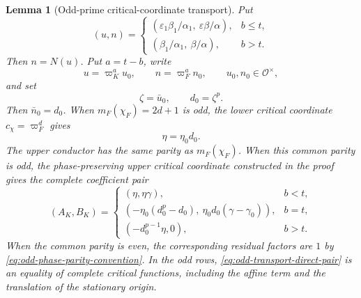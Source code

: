 \documentclass[11pt]{amsart}
\newtheorem{lemma}[theorem]{Lemma}
\theoremstyle{definition}
\theoremstyle{remark}
\newcommand{\cO}{\mathcal O}
\newcommand{\eps}{\varepsilon}
\begin{document}
\begin{lemma}[Odd-prime critical-coordinate transport]
\label{lem:residual-parameter-transport}
Put
\[
 (u,n)=
 \begin{cases}
 \left(\eps_1\beta_1/\alpha_1,\ \eps\beta/\alpha\right),&b\le t,\\[1mm]
 \left(\beta_1/\alpha_1,\ \beta/\alpha\right),&b>t.
 \end{cases}
\]
Then $n=N(u)$.  Put $a=t-b$, write
\[
 u=\varpi_K^a u_0,\qquad n=\varpi_F^a n_0,
 \qquad u_0,n_0\in\cO^\times,
\]
and set
\begin{equation}\label{eq:odd-zeta-definition}
 \zeta=\bar u_0,\qquad d_0=\zeta^p.
\end{equation}
Then $\bar n_0=d_0$.  When $m_F(\chi_F)=2d+1$ is odd, the lower
critical coordinate $c_\chi=\varpi_F^d$ gives
\begin{equation}\label{eq:eta-normalization}
 \eta=\eta_0d_0.
\end{equation}
The upper conductor has the same parity as $m_F(\chi_F)$.  When this
common parity is odd, the phase-preserving upper critical coordinate
constructed in the proof gives the complete coefficient pair
\begin{equation}\label{eq:odd-transport-direct-pair}
 (A_K,B_K)=
 \begin{cases}
 (\eta,\eta\gamma),&b<t,\\[1mm]
 (-\eta_0(d_0^p-d_0),\ \eta_0d_0(\gamma-\gamma_0)),&b=t,\\[1mm]
 (-d_0^{p-1}\eta,0),&b>t.
 \end{cases}
\end{equation}
When the common parity is even, the corresponding residual factors are
$1$ by \eqref{eq:odd-phase-parity-convention}.  In the odd rows,
\eqref{eq:odd-transport-direct-pair} is an equality of complete
critical functions, including the affine term and the translation of
the stationary origin.
\end{lemma}
\end{document}
